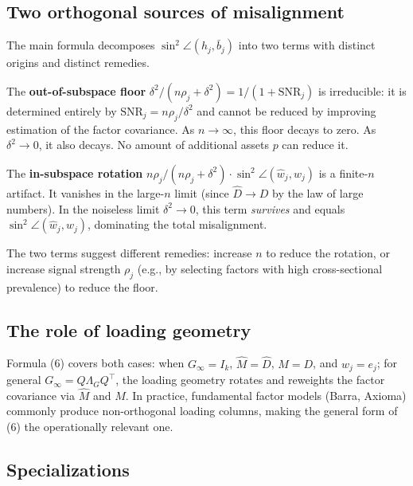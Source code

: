 \documentclass{article}
\theoremstyle{remark}
\begin{document}
\subsection{Two orthogonal sources of misalignment}

The main formula decomposes $\sin^2\angle(h_j,\bar{b}_j)$ into two terms with distinct origins and distinct remedies.

The \textbf{out-of-subspace floor} $\delta^2/(n\rho_j+\delta^2) = 1/(1+\mathrm{SNR}_j)$ is irreducible: it is determined entirely by $\mathrm{SNR}_j = n\rho_j/\delta^2$ and cannot be reduced by improving estimation of the factor covariance. As $n\to\infty$, this floor decays to zero. As $\delta^2\to 0$, it also decays. No amount of additional assets $p$ can reduce it.

The \textbf{in-subspace rotation} $n\rho_j/(n\rho_j+\delta^2)\cdot\sin^2\angle(\hat{w}_j,w_j)$ is a finite-$n$ artifact. It vanishes in the large-$n$ limit (since $\hat{D}\to D$ by the law of large numbers). In the noiseless limit $\delta^2\to 0$, this term \textit{survives} and equals $\sin^2\angle(\hat{w}_j,w_j)$, dominating the total misalignment.

The two terms suggest different remedies: increase $n$ to reduce the rotation, or increase signal strength $\rho_j$ (e.g., by selecting factors with high cross-sectional prevalence) to reduce the floor.

\subsection{The role of loading geometry}

Formula (6) covers both cases: when $G_\infty = I_k$, $\hat{M} = \hat{D}$, $M = D$, and $w_j = e_j$; for general $G_\infty = Q\Lambda_G Q^\top$, the loading geometry rotates and reweights the factor covariance via $\hat{M}$ and $M$. In practice, fundamental factor models (Barra, Axioma) commonly produce non-orthogonal loading columns, making the general form of (6) the operationally relevant one.

\subsection{Specializations}
\end{document}
